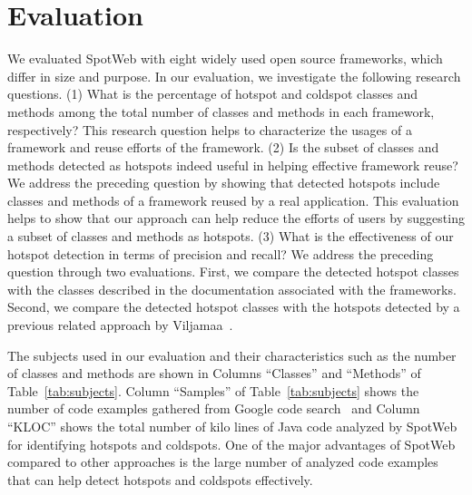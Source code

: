 \section {Evaluation}
\label{sec:eval}

We evaluated SpotWeb with eight widely used open source frameworks,
which differ in size and purpose. In our evaluation, we investigate the
following research questions. (1) What is the percentage of hotspot and coldspot 
classes and methods among the total number of classes and methods in each framework, respectively? 
This research question helps to characterize the usages of a framework and reuse
efforts of the framework. (2) Is the subset of classes and methods detected
as hotspots indeed useful in helping effective framework reuse? We address the preceding question by 
showing that detected hotspots include classes and methods of a framework reused by a real application.
This evaluation helps to show that our approach can help reduce the efforts
of users by suggesting a subset of classes and methods as hotspots.
(3) What is the effectiveness of our hotspot detection in terms of precision and
recall? We address the preceding question through two evaluations. First, we compare
the detected hotspot classes with the classes described in the documentation associated
with the frameworks. Second, we compare the detected hotspot classes with 
the hotspots detected by a previous related approach by Viljamaa~\cite{viljamaa:reverse}.

The subjects used in our evaluation and their
characteristics such as the number of classes and methods are shown
in Columns ``Classes'' and ``Methods'' of Table~\ref{tab:subjects}.
Column ``Samples'' of Table~\ref{tab:subjects} shows the number of
code examples gathered from Google code search~\cite{GCSE} and Column ``KLOC'' shows the total number of
kilo lines of Java code analyzed by SpotWeb for identifying hotspots
and coldspots. One of the major advantages of SpotWeb compared to
other approaches is the large number of analyzed code examples
that can help detect hotspots and coldspots effectively.

